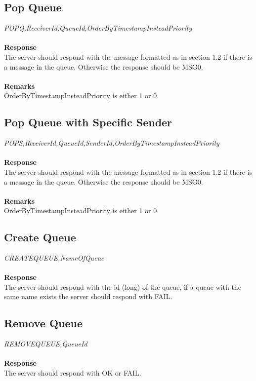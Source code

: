 \documentclass{article}
\begin{document}
            \subsection{Pop Queue}
                \indent\indent\textit{POPQ,ReceiverId,QueueId,OrderByTimestampInsteadPriority}\\
                \\
                \textbf{Response}\\
                The server should respond with the message formatted as in section 1.2 if there is a message in the queue. Otherwise the response should be MSG0.\\
                \\
                \textbf{Remarks}\\
                OrderByTimestampInsteadPriority is either 1 or 0.

            \subsection{Pop Queue with Specific Sender}
                \indent\indent\textit{POPS,ReceiverId,QueueId,SenderId,OrderByTimestampInsteadPriority}\\
                \\
                \textbf{Response}\\
                The server should respond with the message formatted as in section 1.2 if there is a message in the queue. Otherwise the response should be MSG0.\\
                \\
                \textbf{Remarks}\\
                OrderByTimestampInsteadPriority is either 1 or 0.

            \subsection{Create Queue}
                \indent\indent\textit{CREATEQUEUE,NameOfQueue}\\
                \\
                \textbf{Response}\\
                The server should respond with the id (long) of the queue, if a queue with the same name exists the server should respond with FAIL.

            \subsection{Remove Queue}
                \indent\indent\textit{REMOVEQUEUE,QueueId}\\
                \\
                \textbf{Response}\\
                The server should respond with OK or FAIL.
\end{document}
